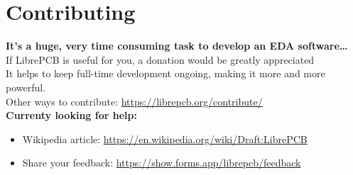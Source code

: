 \section{Contributing}

\begin{frame}{\secname}
  \begin{centering}
    \bigskip
    \textbf{\large{It's a huge, very time consuming task to develop an EDA software\ldots}}\\
    \bigskip
    If LibrePCB is useful for you, a donation would be greatly appreciated \faHeart\\
    It helps to keep full-time development ongoing, making it more and more
    powerful.\\
    \bigskip
    Other ways to contribute: \url{https://librepcb.org/contribute/}\\
    \bigskip
    \bigskip
    \textbf{Currenty looking for help:}
    \begin{itemize}
      \centering
      \item Wikipedia article: \url{https://en.wikipedia.org/wiki/Draft:LibrePCB}
      \item Share your feedback: \url{https://show.forms.app/librepcb/feedback}
    \end{itemize}
  \end{centering}
\end{frame}

